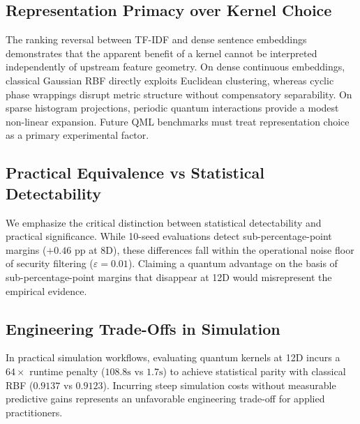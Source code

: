 \documentclass[10pt,twocolumn,letterpaper]{article}
\begin{document}
\subsection{Representation Primacy over Kernel Choice}
The ranking reversal between TF-IDF and dense sentence embeddings demonstrates that the apparent benefit of a kernel cannot be interpreted independently of upstream feature geometry. On dense continuous embeddings, classical Gaussian RBF directly exploits Euclidean clustering, whereas cyclic phase wrappings disrupt metric structure without compensatory separability. On sparse histogram projections, periodic quantum interactions provide a modest non-linear expansion. Future QML benchmarks must treat representation choice as a primary experimental factor.

\subsection{Practical Equivalence vs Statistical Detectability}
We emphasize the critical distinction between statistical detectability and practical significance. While 10-seed evaluations detect sub-percentage-point margins ($+0.46$ pp at 8D), these differences fall within the operational noise floor of security filtering ($\varepsilon = 0.01$). Claiming a quantum advantage on the basis of sub-percentage-point margins that disappear at 12D would misrepresent the empirical evidence.

\subsection{Engineering Trade-Offs in Simulation}
In practical simulation workflows, evaluating quantum kernels at 12D incurs a $64\times$ runtime penalty ($108.8\text{s}$ vs $1.7\text{s}$) to achieve statistical parity with classical RBF ($0.9137$ vs $0.9123$). Incurring steep simulation costs without measurable predictive gains represents an unfavorable engineering trade-off for applied practitioners.
\end{document}
